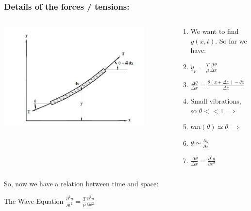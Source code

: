 \documentclass[pdf, hideothersubsections]{beamer}
\begin{document}
\begin{frame}
\frametitle{Details of the forces / tensions:}
\begin{columns}

  \begin{column}{0.4\textwidth}
    \centering
    \includegraphics[width=0.85\textwidth]{StringForceDiagram.png}

  \end{column}

  \begin{column}{0.6\textwidth}
    \begin{enumerate}
    \item We want to find $y(x,t)$. So far we have:
      \pause
    \item $\ddot{y}_p = \frac{T}{\mu} \frac{\Delta \theta}{\Delta x}$
      \pause
    \item $\frac{\Delta \theta}{\Delta x} = \frac{\theta(x + \Delta x) -
        \theta{x}}{\Delta x}$
      \pause
    \item Small vibrations, so $\theta << 1 \implies$ 
      \pause
    \item $tan(\theta) \simeq \theta \implies$
      \pause
    \item $\theta \simeq \frac{\partial y}{\partial x}$
      \pause
      \item $\frac{\Delta \theta}{\Delta x} = \frac{\partial^2 y}{\partial x^2}$

    \end{enumerate}
  \end{column}
\pause
\end{columns}
So, now we have a relation between time and space:
\pause
\begin{block}{The Wave Equation}
\centering
$ \frac{\partial^2 y}{\partial t^2} = \frac{T}{\mu} \frac{\partial^2 y}{\partial x^2}$
\end{block}


\end{frame}
\end{document}
